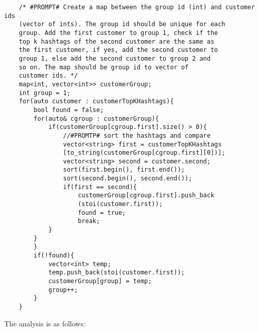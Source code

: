 \documentclass[12pt]{article}
\begin{document}
\begin{verbatim}
    /* #PROMPT# Create a map between the group id (int) and customer ids 
    (vector of ints). The group id should be unique for each 
    group. Add the first customer to group 1, check if the 
    top k hashtags of the second customer are the same as 
    the first customer, if yes, add the second customer to 
    group 1, else add the second customer to group 2 and 
    so on. The map should be group id to vector of 
    customer ids. */
    map<int, vector<int>> customerGroup;
    int group = 1;
    for(auto customer : customerTopKHashtags){
        bool found = false;
        for(auto& cgroup : customerGroup){
            if(customerGroup[cgroup.first].size() > 0){
                //#PROMTP# sort the hashtags and compare
                vector<string> first = customerTopKHashtags
                [to_string(customerGroup[cgroup.first][0])];
                vector<string> second = customer.second;
                sort(first.begin(), first.end());
                sort(second.begin(), second.end());
                if(first == second){
                    customerGroup[cgroup.first].push_back
                    (stoi(customer.first));
                    found = true;
                    break;
            }
        }
        }
        if(!found){
            vector<int> temp;
            temp.push_back(stoi(customer.first));
            customerGroup[group] = temp;
            group++;
        }
    }
\end{verbatim}
The analysis is as follows:
\end{document}
